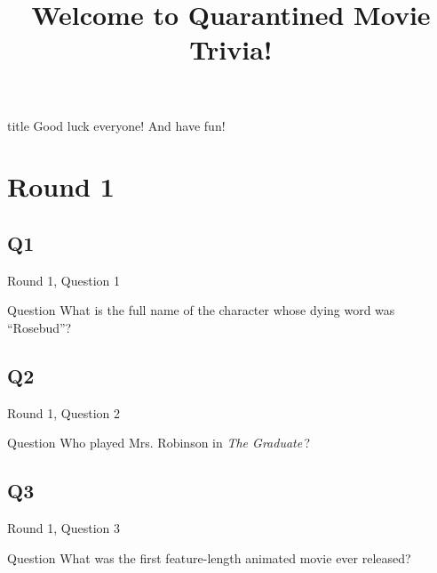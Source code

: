 \documentclass[11pt]{beamer}
\begin{document}
\title{Welcome to Quarantined Movie Trivia!}
\date{}

\begin{frame}
\titlepage{}
\end{frame}

\begingroup{}
\begin{frame}
\vfill{}
\begin{beamercolorbox}[sep=8pt,center,shadow=true,rounded=true]{title}
Good luck everyone! And have fun!
\end{beamercolorbox}
\vfill{}
\end{frame}
\endgroup{}
    

\section{Round 1}
    

\subsection*{Q1}
\begin{frame}[t]{Round 1, Question 1}
\vspace{2em}
\begin{block}{Question}
What is the full name of the character whose dying word was ``Rosebud''?
\end{block}
\end{frame}
    

\subsection*{Q2}
\begin{frame}[t]{Round 1, Question 2}
\vspace{2em}
\begin{block}{Question}
Who played Mrs. Robinson in \emph{The Graduate}\,?
\end{block}
\end{frame}
    

\subsection*{Q3}
\begin{frame}[t]{Round 1, Question 3}
\vspace{2em}
\begin{block}{Question}
What was the first feature-length animated movie ever released?
\end{block}
\end{frame}
    
\end{document}
